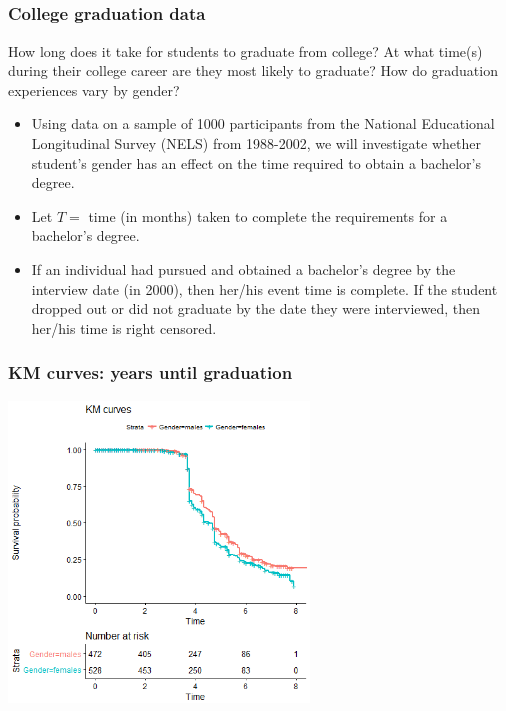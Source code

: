 \subsection{}
\begin{frame}
\end{frame}

\begin{frame}
\frametitle{College graduation data}
How long does it take for students to graduate from college?  At what time(s) during their college career are they most likely to graduate?  How do graduation experiences vary by gender?
\begin{itemize}
\item Using data on a sample of 1000 participants from the National Educational Longitudinal Survey (NELS) from 1988-2002, we will investigate whether student's gender has an effect on the time required to obtain a bachelor's degree.
\item Let $T=$ time (in months) taken to complete the requirements for a bachelor's degree.
\item If an individual had pursued and obtained a bachelor's degree by the interview date (in 2000), then her/his
event time is complete. If the student dropped out or did not graduate by the date they were interviewed, then her/his time is right censored.
\end{itemize}
\end{frame}

\begin{frame}
\frametitle{KM curves: years until graduation}
\includegraphics[width=0.6\textwidth]{Figures/KM_grad_surv.png}
\end{frame}

